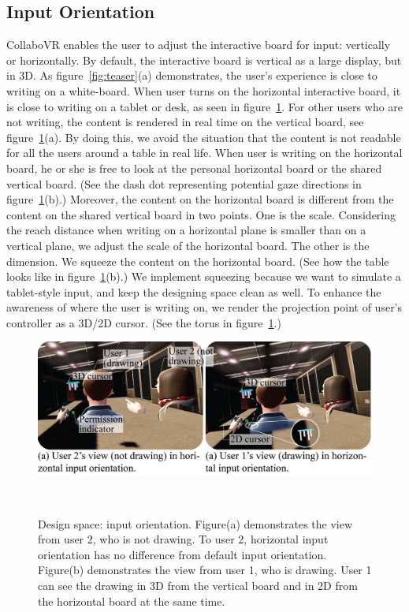 \documentclass{sigchi}
\begin{document}
\subsection{Input Orientation}
CollaboVR enables the user to adjust the interactive board for input: vertically or horizontally. By default, the interactive board is vertical as a large display, but in 3D. As figure~\ref{fig:teaser}(a) demonstrates, the user's experience is close to writing on a white-board. When user turns on the horizontal interactive board, it is close to writing on a tablet or desk, as seen in figure~\ref{fig:inputorientation}. For other users who are not writing, the content is rendered in real time on the vertical board, see figure~\ref{fig:inputorientation}(a). By doing this, we avoid the situation that the content is not readable for all the users around a table in real life. When user is writing on the horizontal board, he or she is free to look at the personal horizontal board or the shared vertical board. (See the dash dot representing potential gaze directions in figure~\ref{fig:inputorientation}(b).) Moreover, the content on the horizontal board is different from the content on the shared vertical board in two points. One is the scale. Considering the reach distance when writing on a horizontal plane is smaller than on a vertical plane, we adjust the scale of the horizontal board. The other is the dimension. We squeeze the content on the horizontal board. (See how the table looks like in figure~\ref{fig:inputorientation}(b).) We implement squeezing because we want to simulate a tablet-style input, and keep the designing space clean as well. To enhance the awareness of where the user is writing on, we render the projection point of user's controller as a 3D/2D cursor. (See the torus in figure~\ref{fig:inputorientation}.)

\begin{figure}[b!]
 \centering
 \includegraphics[width=0.95\columnwidth]{Figure4.png}
 \caption{Design space: input orientation. Figure(a) demonstrates the view from user 2, who is not drawing. To user 2, horizontal input orientation has no difference from default input orientation. Figure(b) demonstrates the view from user 1, who is drawing. User 1 can see the drawing in 3D from the vertical board and in 2D from the horizontal board at the same time.
 }~\label{fig:inputorientation}
\end{figure}
\end{document}
